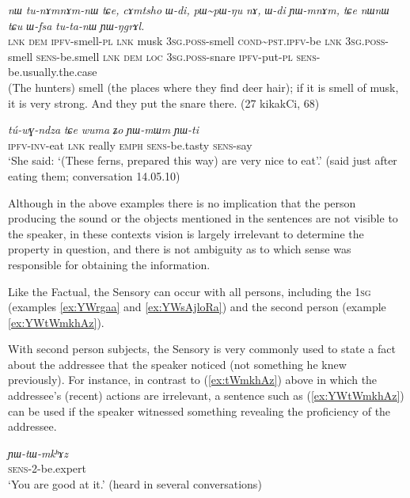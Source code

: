 \documentclass[11pt]{article}
\newcommand{\ipa}[1]{{\phon\textit{#1}}} %
\newcommand{\refb}[1]{(\ref{#1})}
\newcommand{\rdp}{\textasciitilde{}}
\begin{document}
\begin{exe}
\ex \label{ex:tunAmnAmnW}
\gll \ipa{tɕe} 	\ipa{nɯ} 	\ipa{tu-nɤmnɤm-nɯ} 	\ipa{tɕe,} 	\ipa{cɤmtsho} 	\ipa{ɯ-di,} 	\ipa{pɯ\rdp{}pɯ-ŋu} 	\ipa{nɤ,} 	\ipa{ɯ-di} 	\ipa{ɲɯ-mnɤm,} \ipa{tɕe} 	\ipa{nɯnɯ} 	\ipa{tɕu} 	\ipa{ɯ-fsa} 	\ipa{tu-ta-nɯ} 	\ipa{ɲɯ-ŋgrɤl.} \\
\textsc{lnk} \textsc{dem} \textsc{ipfv}-smell-\textsc{pl} \textsc{lnk} musk \textsc{3sg.poss}-smell \textsc{cond\rdp{}pst.ipfv}-be \textsc{lnk} \textsc{3sg.poss}-smell \textsc{sens}-be.smell \textsc{lnk} \textsc{dem} \textsc{loc} \textsc{3sg.poss}-snare \textsc{ipfv}-put-\textsc{pl} \textsc{sens}-be.usually.the.case \\
\glt (The hunters) smell (the places where they find deer hair); if it is smell of musk, it is very strong. And they put the snare there. (27 kikakCi, 68)
\end{exe}

\begin{exe}
\ex \label{ex:YWmWm}
\gll
\ipa{tú-wɣ-ndza} 	\ipa{tɕe} 	\ipa{wuma} 	\ipa{ʑo} 	\ipa{ɲɯ-mɯm} 	\ipa{ɲɯ-ti} \\
\textsc{ipfv-inv}-eat \textsc{lnk} really \textsc{emph} \textsc{sens}-be.tasty \textsc{sens}-say \\
\glt `She said: `(These ferns, prepared this way) are very nice to eat'.' (said just after eating them; conversation 14.05.10)
\end{exe}

Although in the above examples there is no implication that the person producing the sound or the objects mentioned in the sentences are not visible to the speaker, in these contexts vision is largely irrelevant to determine the property in question, and there is not ambiguity as to which sense was responsible for obtaining the information.  

Like the Factual, the Sensory can occur with all persons, including the \textsc{1sg} (examples \ref{ex:YWrgaa} and \ref{ex:YWsAjloRa}) and the second person (example \ref{ex:YWtWmkhAz}).

With second person subjects, the Sensory is very commonly used to state a fact about the addressee that the speaker noticed (not something he knew previously). For instance, in contrast to \refb{ex:tWmkhAz} above in which the addressee's (recent) actions are irrelevant, a sentence such as \refb{ex:YWtWmkhAz} can be used if the speaker witnessed something revealing the proficiency of the addressee.

\begin{exe}
\ex \label{ex:YWtWmkhAz}
\gll 
 \ipa{ɲɯ-tɯ-mkʰɤz} \\
\textsc{sens}-2-be.expert \\
\glt `You are good at it.' (heard in several conversations)
\end{exe}
\end{document}
